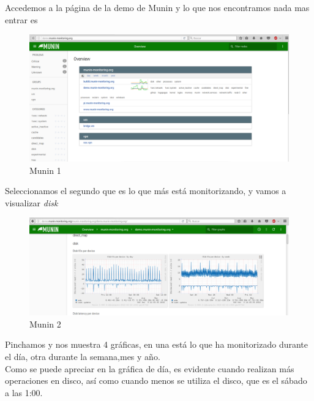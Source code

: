 Accedemos a la página de la demo de Munin \cite{munim} y lo que nos encontramos nada mas entrar es 

\begin{figure}[H] %
	\centering
	\includegraphics[scale=0.35]{pics/munin1.png}  %
	\caption{Munin 1} \label{fig:munin1}
\end{figure}

Seleccionamos el segundo que es lo que más está monitorizando, y vamos a visualizar \textit{disk}

\begin{figure}[H] %
	\centering
	\includegraphics[scale=0.35]{pics/munin2.png}  %
	\caption{Munin 2} \label{fig:munin2}
\end{figure}

Pinchamos y nos muestra 4 gráficas, en una está lo que ha monitorizado durante el día, otra durante la semana,mes y año.\\

Como se puede apreciar en la gráfica de día, es evidente cuando realizan más operaciones en disco, así como cuando menos se utiliza el disco, que es el sábado a las 1:00.


